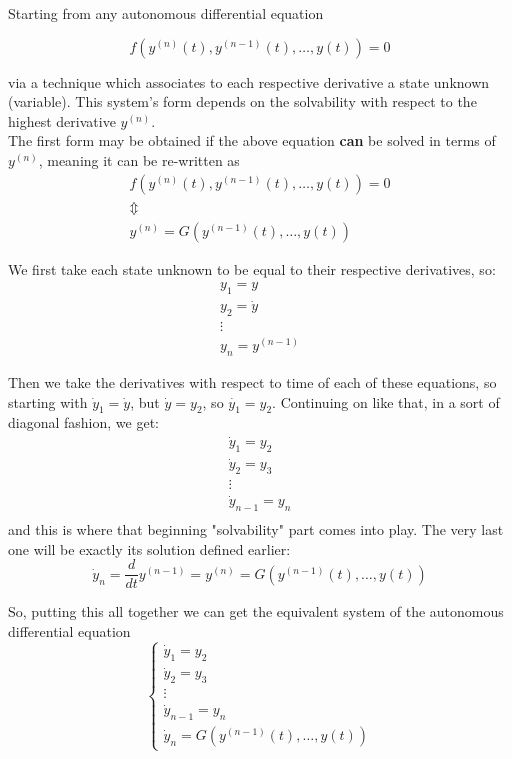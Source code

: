 Starting from any autonomous differential equation

\[
    f(y^{(n)}(t), y^{(n-1)}(t), \dots, y(t))= 0
\]


via a technique which associates to each respective derivative a state unknown (variable).
This system's form depends on the solvability with respect to the highest derivative $y^{(n)}$. \\
The first form may be obtained if the above equation \textbf{can} be solved in terms of $y^{(n)}$, meaning it can be re-written as
\begin{gather*}
    f(y^{(n)}(t), y^{(n-1)}(t), \dots, y(t))= 0 \\
    \Updownarrow \\
    y^{(n)}  = G(y^{(n-1)}(t), \dots, y(t))
\end{gather*}


We first take each state unknown to be equal to their respective derivatives, so:
\begin{gather*}
    y_1 = y     \\
    y_2 = \dot{y} \\
    \vdots \\
    y_n = y^{(n-1)}
\end{gather*}

Then we take the derivatives with respect to time of each of these equations, so starting with $\dot{y}_1 = \dot{y}$, but $\dot{y} = y_2$, so $\dot{y_1}=y_2$. Continuing on like that, in a sort of diagonal fashion, we get:
\begin{gather*}
    \dot{y}_1 = y_2 \\
    \dot{y}_2 = y_3 \\
    \vdots \\
    \dot{y}_{n-1} = y_n \\
\end{gather*}
and this is where that beginning "solvability" part comes into play. The very last one will be exactly its solution defined earlier:
\[
    \dot{y}_n = \frac{d}{dt}y^{(n-1)} = y^{(n)}  = G(y^{(n-1)}(t), \dots, y(t))
\]

So, putting this all together we can get the equivalent system of the autonomous differential equation
\[
    \begin{cases}
        \dot{y}_1 = y_2     \\
        \dot{y}_2 = y_3     \\
        \vdots              \\
        \dot{y}_{n-1} = y_n \\
        \dot{y}_n  = G(y^{(n-1)}(t), \dots, y(t))
    \end{cases}
\]

